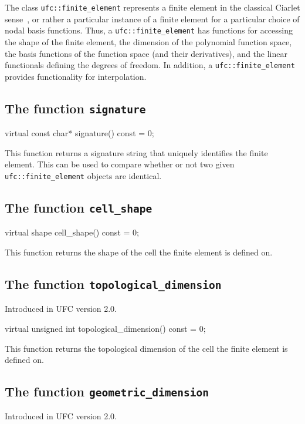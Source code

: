 The class \texttt{ufc::finite\_element} represents a finite element in
the classical Ciarlet sense~\cite{Cia78}, or rather a particular
instance of a finite element for a particular choice of nodal basis
functions. Thus, a \texttt{ufc::finite\_element} has functions for
accessing the shape of the finite element, the dimension of the
polynomial function space, the basis functions of the function space
(and their derivatives), and the linear functionals defining the
degrees of freedom. In addition, a \texttt{ufc::finite\_element}
provides functionality for interpolation.

\subsection{The function \texttt{signature}}

\begin{code}
virtual const char* signature() const = 0;
\end{code}

This function returns a signature string that uniquely identifies the
finite element. This can be used to compare whether or not two given
\texttt{ufc::fi\-nite\_element} objects are identical.

\subsection{The function \texttt{cell\_shape}}

\begin{code}
virtual shape cell_shape() const = 0;
\end{code}

This function returns the shape of the cell the finite element is
defined on.

\subsection{The function \texttt{topological\_dimension}}
Introduced in UFC version 2.0.

\begin{code}
virtual unsigned int topological_dimension() const = 0;
\end{code}

This function returns the topological dimension of the cell the finite
element is defined on.

\subsection{The function \texttt{geometric\_dimension}}
Introduced in UFC version 2.0.

